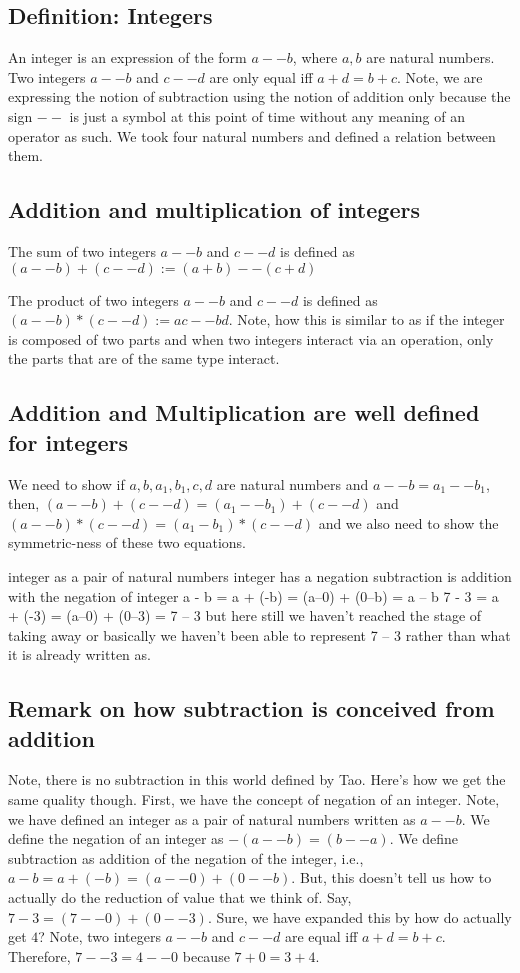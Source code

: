 \documentclass{report}
\begin{document}
\subsection{Definition: Integers}
An integer is an expression of the form  $a--b$, where $a,b$ are natural numbers. Two integers $a--b$ and $c--d$ are only equal iff $a+d=b+c$. Note, we are expressing the notion of subtraction using the notion of addition only because the sign $--$ is just a symbol at this point of time without any meaning of an operator as such. We took four natural numbers and defined a relation between them.  

\subsection{Addition and multiplication of integers}
The sum of two integers $a--b$ and  $c--d$ is defined as  $(a--b) + (c--d) := (a+b) -- (c+d)$ 

The product of two integers $a--b$ and $c--d$ is defined as $(a--b) * (c--d) := ac -- bd$. Note, how this is similar to as if the integer is composed of two parts and when two integers interact via an operation, only the parts that are of the same type interact.


\subsection{Addition and Multiplication are well defined for integers}
We need to show if $a,b,a_1,b_1, c,d$ are natural numbers and $a--b=a_1--b_1$, then, $(a--b) + (c--d) = (a_1--b_1) + (c--d)$ and $(a--b) * (c--d) = (a_1-b_1) * (c--d)$ and we also need to show the symmetric-ness of these two equations.

integer as a pair of natural numbers
integer has a negation
subtraction is addition with the negation of integer
a - b = a + (-b) = (a--0) + (0--b) = a -- b
7 - 3 = a + (-3) = (a--0) + (0--3) = 7 -- 3 but here still we haven't reached the stage
of taking away or basically we haven't been able to represent 7 -- 3 rather than what it is already written as.
\subsection*{Remark on how subtraction is conceived from addition}
Note, there is no subtraction in this world defined by Tao. Here's how we get the same quality though. First, we have the concept of negation of an integer. Note, we have defined an integer as a pair of natural numbers written as $a--b$. We define the negation of an integer as  $-(a--b) = (b--a)$. We define subtraction as addition of the negation of the integer, i.e.,  $a-b = a + (-b) = (a--0) + (0--b)$. But, this doesn't tell us how to actually do the reduction of value that we think of. Say,  $7-3 = (7--0)+(0--3)$. Sure, we have expanded this by how do actually get  $4$?  Note, two integers  $a--b$ and  $c--d$ are equal iff $a+d=b+c$. Therefore,  $7--3 = 4--0 $ because  $7+0=3+4$. 
\end{document}
